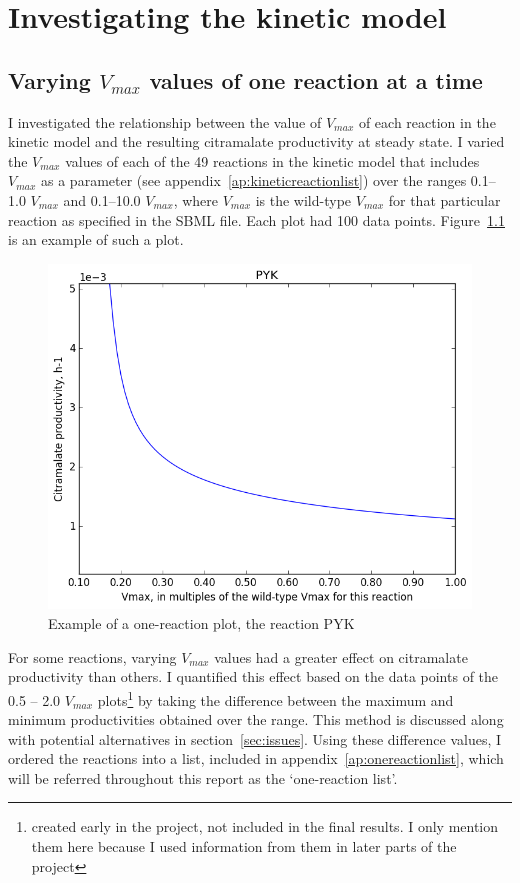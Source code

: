 \documentclass[parskip=full, numbers=noenddot]{scrreprt}
\begin{document}
\chapter{Investigating the kinetic model}
\label{ch:kinetic}

\section{Varying $V_{max}$ values of one reaction at a time}
\label{sec:onereac}

I investigated the relationship between the value of $V_{max}$ of each reaction in the kinetic model and the resulting citramalate productivity at steady state. I varied the $V_{max}$ values of each of the 49 reactions in the kinetic model that includes $V_{max}$ as a parameter (see appendix~\ref{ap:kineticreactionlist}) over the ranges 0.1--1.0 $V_{max}$ and 0.1--10.0 $V_{max}$, where $V_{max}$ is the wild-type $V_{max}$ for that particular reaction as specified in the SBML file. Each plot had 100 data points. Figure~\ref{fig:onereacsample} is an example of such a plot.

\begin{figure}[h]
  \centering
  \includegraphics[scale=0.5]{onereacsample}
  \caption{Example of a one-reaction plot, the reaction PYK}
  \label{fig:onereacsample}
\end{figure}

For some reactions, varying $V_{max}$ values had a greater effect on citramalate productivity than others. I quantified this effect based on the data points of the 0.5 -- 2.0 $V_{max}$ plots\footnote{created early in the project, not included in the final results. I only mention them here because I used information from them in later parts of the project} by taking the difference between the maximum and minimum productivities obtained over the range. This method is discussed along with potential alternatives in section~\ref{sec:issues}. Using these difference values, I ordered the reactions into a list, included in appendix~\ref{ap:onereactionlist}, which will be referred throughout this report as the `one-reaction list'.
\end{document}

